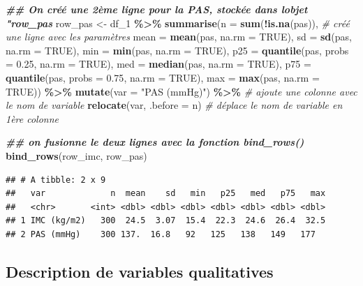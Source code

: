 \documentclass[
]{book}
\newenvironment{Shaded}{\begin{snugshade}}{\end{snugshade}}
\newcommand{\AttributeTok}[1]{\textcolor[rgb]{0.13,0.29,0.53}{#1}}
\newcommand{\CommentTok}[1]{\textcolor[rgb]{0.56,0.35,0.01}{\textit{#1}}}
\newcommand{\ConstantTok}[1]{\textcolor[rgb]{0.56,0.35,0.01}{#1}}
\newcommand{\DocumentationTok}[1]{\textcolor[rgb]{0.56,0.35,0.01}{\textbf{\textit{#1}}}}
\newcommand{\FloatTok}[1]{\textcolor[rgb]{0.00,0.00,0.81}{#1}}
\newcommand{\FunctionTok}[1]{\textcolor[rgb]{0.13,0.29,0.53}{\textbf{#1}}}
\newcommand{\NormalTok}[1]{#1}
\newcommand{\OtherTok}[1]{\textcolor[rgb]{0.56,0.35,0.01}{#1}}
\newcommand{\SpecialCharTok}[1]{\textcolor[rgb]{0.81,0.36,0.00}{\textbf{#1}}}
\newcommand{\StringTok}[1]{\textcolor[rgb]{0.31,0.60,0.02}{#1}}
\begin{document}
\begin{Shaded}
\begin{Highlighting}[]
\DocumentationTok{\#\# On créé une 2ème ligne pour la PAS, stockée dans l\textquotesingle{}objet "row\_pas}
\NormalTok{row\_pas }\OtherTok{\textless{}{-}}\NormalTok{ df\_1 }\SpecialCharTok{\%\textgreater{}\%} 
  \FunctionTok{summarise}\NormalTok{(}\AttributeTok{n =} \FunctionTok{sum}\NormalTok{(}\SpecialCharTok{!}\FunctionTok{is.na}\NormalTok{(pas)), }\CommentTok{\# créé une ligne avec les paramètres}
            \AttributeTok{mean =} \FunctionTok{mean}\NormalTok{(pas, }\AttributeTok{na.rm =} \ConstantTok{TRUE}\NormalTok{),}
            \AttributeTok{sd =} \FunctionTok{sd}\NormalTok{(pas, }\AttributeTok{na.rm =} \ConstantTok{TRUE}\NormalTok{), }
            \AttributeTok{min =} \FunctionTok{min}\NormalTok{(pas, }\AttributeTok{na.rm =} \ConstantTok{TRUE}\NormalTok{), }
            \AttributeTok{p25 =} \FunctionTok{quantile}\NormalTok{(pas, }\AttributeTok{probs =} \FloatTok{0.25}\NormalTok{, }\AttributeTok{na.rm =} \ConstantTok{TRUE}\NormalTok{),}
            \AttributeTok{med =} \FunctionTok{median}\NormalTok{(pas, }\AttributeTok{na.rm =} \ConstantTok{TRUE}\NormalTok{),}
            \AttributeTok{p75 =} \FunctionTok{quantile}\NormalTok{(pas, }\AttributeTok{probs =} \FloatTok{0.75}\NormalTok{, }\AttributeTok{na.rm =} \ConstantTok{TRUE}\NormalTok{),}
            \AttributeTok{max =} \FunctionTok{max}\NormalTok{(pas, }\AttributeTok{na.rm =} \ConstantTok{TRUE}\NormalTok{)) }\SpecialCharTok{\%\textgreater{}\%}
  \FunctionTok{mutate}\NormalTok{(}\AttributeTok{var =} \StringTok{"PAS (mmHg)"}\NormalTok{) }\SpecialCharTok{\%\textgreater{}\%} \CommentTok{\# ajoute une colonne avec le nom de variable}
  \FunctionTok{relocate}\NormalTok{(var, }\AttributeTok{.before =}\NormalTok{ n) }\CommentTok{\# déplace le nom de variable en 1ère colonne}

\DocumentationTok{\#\# on fusionne le deux lignes avec la fonction bind\_rows()}
\FunctionTok{bind\_rows}\NormalTok{(row\_imc, row\_pas)}
\end{Highlighting}
\end{Shaded}

\begin{verbatim}
## # A tibble: 2 x 9
##   var             n  mean    sd   min   p25   med   p75   max
##   <chr>       <int> <dbl> <dbl> <dbl> <dbl> <dbl> <dbl> <dbl>
## 1 IMC (kg/m2)   300  24.5  3.07  15.4  22.3  24.6  26.4  32.5
## 2 PAS (mmHg)    300 137.  16.8   92   125   138   149   177
\end{verbatim}

\subsection{Description de variables qualitatives}\label{description-de-variables-qualitatives}
\end{document}
